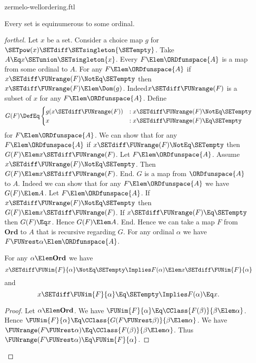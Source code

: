 \documentclass{stex}
\newcommand\Ord{\textbf{Ord}}
\begin{document}
\begin{smodule}{zermelo-wellordering.ftl}
\begin{theorem}[forthel,title=Zermelo's Well-Ordering Theorem,name=Zermelo]
  Every set is equinumerous to some ordinal.
\end{theorem}
\begin{proof}[forthel]
  Let $x$ be a set.
  Consider a choice map $g$ for $\SETpow(x) \SETdiff \SETsingleton{\SETempty}$.
  Take $A \Eq x \SETunion \SETsingleton{x}$.
  Every $F \Elem \ORDfunspace{A}$ is a map from some ordinal to $A$.
  For any $F \Elem \ORDfunspace{A}$ if $x \SETdiff \FUNrange(F) \NotEq \SETempty$ then $x \SETdiff \FUNrange(F) \Elem \Dom(g)$.
  Indeed\linebreak $x \SETdiff \FUNrange(F)$ is a subset of $x$ for any $F \Elem \ORDfunspace{A}$.
  Define \[ G(F) \DefEq
    \begin{cases}
      g(x \SETdiff \FUNrange(F))
      & : x \SETdiff \FUNrange(F) \NotEq \SETempty
      \\
      x
      & : x \SETdiff \FUNrange(F) \Eq \SETempty
    \end{cases} \]
  for $F \Elem \ORDfunspace{A}$.
  We can show that for any $F \Elem \ORDfunspace{A}$ if $x \SETdiff \FUNrange(F) \NotEq \SETempty$ then $G(F) \Elem x \SETdiff \FUNrange(F)$.
    Let $F \Elem \ORDfunspace{A}$.
    Assume $x \SETdiff \FUNrange(F) \NotEq \SETempty$.  
    Then $G(F) \Elem x \SETdiff \FUNrange(F)$.
  End.
  $G$ is a map from $\ORDfunspace{A}$ to $A$.
  Indeed we can show that for any $F \Elem \ORDfunspace{A}$ we have $G(F) \Elem A$.
    Let $F \Elem \ORDfunspace{A}$.
    If $x \SETdiff \FUNrange(F) \NotEq \SETempty$ then\linebreak $G(F) \Elem x \SETdiff \FUNrange(F)$.
    If $x \SETdiff \FUNrange(F) \Eq \SETempty$ then $G(F) \Eq x$.
    Hence $G(F) \Elem A$.
  End.
  Hence we can take a map $F$ from $\Ord$ to $A$ that is recursive regarding $G$.
  For any ordinal $\alpha$ we have $F \FUNrest \alpha \Elem \ORDfunspace{A}$.

  For any $\alpha \Elem \Ord$ we have
  \[ x \SETdiff \FUNim{F}{\alpha} \NotEq \SETempty \Implies F(\alpha) \Elem x \SETdiff \FUNim{F}{\alpha} \]
  and
  \[ x \SETdiff \FUNim{F}{\alpha} \Eq \SETempty \Implies F(\alpha) \Eq x. \]
  \begin{proof}
    Let $\alpha \Elem \Ord$.
    We have $\FUNim{F}{\alpha} \Eq \CClass{F(\beta)}{\beta \Elem \alpha}$.
    Hence $\FUNim{F}{\alpha} \Eq \CClass{G(F \FUNrest \beta)}{\beta \Elem \alpha}$.
    We have $\FUNrange(F \FUNrest \alpha) \Eq \CClass{F(\beta)}{\beta \Elem \alpha}$.
    Thus\linebreak $\FUNrange(F \FUNrest \alpha) \Eq \FUNim{F}{\alpha}$.


\end{proof}
\end{proof}
\end{smodule}
\end{document}
